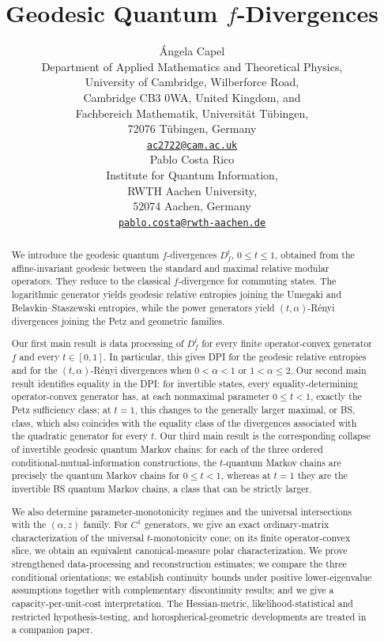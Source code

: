 \documentclass[11pt]{article}
\title{Geodesic Quantum $f$-Divergences}
\author{%
\'Angela Capel\\
{\small Department of Applied Mathematics and Theoretical Physics,}\\
{\small University of Cambridge, Wilberforce Road,}\\
{\small Cambridge CB3 0WA, United Kingdom, and}\\
{\small Fachbereich Mathematik, Universit\"at T\"ubingen,}\\
{\small 72076 T\"ubingen, Germany}\\
{\small \href{mailto:ac2722@cam.ac.uk}{\texttt{ac2722@cam.ac.uk}}}\\[1.1em]
Pablo Costa Rico\\
{\small Institute for Quantum Information,}\\
{\small RWTH Aachen University,
}\\
{\small 52074 Aachen, Germany}\\
{\small \href{mailto:pablo.costa@rwth-aachen.de}{\texttt{pablo.costa@rwth-aachen.de}}}\\[1.1em]
}
\date{}
\theoremstyle{remark}
\newcommand{\1}{\mathbbm{1}}
\begin{document}
\maketitle

\begin{abstract}
We introduce the geodesic quantum $f$-divergences $D_f^t$,
$0\leq t\leq1$, obtained from the affine-invariant geodesic between
the standard and maximal relative modular operators.  They reduce to
the classical $f$-divergence for commuting states.  The logarithmic
generator yields geodesic relative entropies joining the Umegaki and
Belavkin--Staszewski entropies, while the power generators yield
$(t,\alpha)$-R\'enyi divergences joining the Petz and geometric
families.

Our first main result is data processing of $D_f^t$ for every finite
operator-convex generator $f$ and every $t\in[0,1]$.  In particular, this gives DPI for the geodesic relative entropies and for the $(t,\alpha)$-R\'enyi divergences when
$0<\alpha<1$ or $1<\alpha\leq2$. Our second main result identifies equality in the DPI: for invertible states, every equality-determining operator-convex generator
has, at each nonmaximal parameter $0\leq t<1$, exactly the Petz
sufficiency class; at $t=1$, this changes to the generally larger
maximal, or BS, class, which also coincides with the equality class of the divergences associated with the quadratic generator
for every $t$. Our third main result is the corresponding collapse of invertible
geodesic quantum Markov chains: for each of the three ordered
conditional-mutual-information constructions, the $t$-quantum Markov
chains are precisely the quantum Markov chains for $0\leq t<1$,
whereas at $t=1$ they are the invertible BS quantum Markov chains, a
class that can be strictly larger.

We also determine parameter-monotonicity regimes and the universal
intersections with the $(\alpha,z)$ family.  For $C^1$ generators, we
give an exact ordinary-matrix characterization of the universal
$t$-monotonicity cone; on its finite operator-convex slice, we obtain
an equivalent canonical-measure polar characterization.  We prove strengthened data-processing and
reconstruction estimates; we compare the three conditional
orientations; we establish continuity bounds under positive
lower-eigenvalue assumptions together with complementary
discontinuity results; and we give a capacity-per-unit-cost
interpretation.  The Hessian-metric,
likelihood-statistical and restricted hypothesis-testing, and
horospherical-geometric developments are treated in a companion paper.
\end{abstract}
\end{document}
